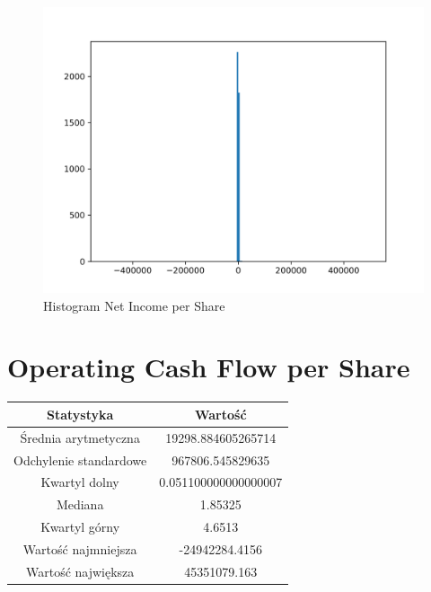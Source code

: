 \documentclass{article}
\begin{document}
\begin{figure}[h!]
    \includegraphics[width=\linewidth]{variables/Net Income per Share.png}
    \caption{Histogram Net Income per Share }
\end{figure}\section{ Operating Cash Flow per Share }

\begin{center}
    \begin{tabular}{|c | c|} 
    \hline
    Statystyka & Wartość \\
    \hline\hline
    Średnia arytmetyczna & 19298.884605265714 \\ 
    \hline
    Odchylenie standardowe & 967806.545829635 \\
    \hline
    Kwartyl dolny & 0.051100000000000007 \\
    \hline
    Mediana & 1.85325 \\
    \hline
    Kwartyl górny & 4.6513 \\
    \hline
    Wartość najmniejsza & -24942284.4156 \\
    \hline
    Wartość największa & 45351079.163 \\
    \hline
   \end{tabular}
\end{center}
\end{document}
